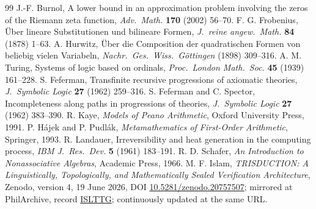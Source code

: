 \documentclass[twocolumn,10pt]{article}
\theoremstyle{plain}
\theoremstyle{definition}
\begin{document}
\begin{thebibliography}{99}
 J.-F. Burnol, A lower bound in an approximation problem involving the zeros of the Riemann zeta function, \emph{Adv.\ Math.} \textbf{170} (2002) 56--70.
 F. G. Frobenius, \"Uber lineare Substitutionen und bilineare Formen, \emph{J.\ reine angew.\ Math.} \textbf{84} (1878) 1--63.
 A. Hurwitz, \"Uber die Composition der quadratischen Formen von beliebig vielen Variabeln, \emph{Nachr.\ Ges.\ Wiss.\ G\"ottingen} (1898) 309--316.
 A. M. Turing, Systems of logic based on ordinals, \emph{Proc.\ London Math.\ Soc.} \textbf{45} (1939) 161--228.
 S. Feferman, Transfinite recursive progressions of axiomatic theories, \emph{J.\ Symbolic Logic} \textbf{27} (1962) 259--316.
 S. Feferman and C. Spector, Incompleteness along paths in progressions of theories, \emph{J.\ Symbolic Logic} \textbf{27} (1962) 383--390.
 R. Kaye, \emph{Models of Peano Arithmetic}, Oxford University Press, 1991.
 P. H\'ajek and P. Pudl\'ak, \emph{Metamathematics of First-Order Arithmetic}, Springer, 1993.
 R. Landauer, Irreversibility and heat generation in the computing process, \emph{IBM J.\ Res.\ Dev.} \textbf{5} (1961) 183--191.
 R. D. Schafer, \emph{An Introduction to Nonassociative Algebras}, Academic Press, 1966.
 M. F. Islam, \emph{TRISDUCTION: A Linguistically, Topologically, and Mathematically Sealed Verification Architecture}, Zenodo, version 4, 19 June 2026, DOI \href{https://doi.org/10.5281/zenodo.20757507}{10.5281/zenodo.20757507}; mirrored at PhilArchive, record \href{https://philpapers.org/rec/ISLTTG}{ISLTTG}; continuously updated at the same URL.
\end{thebibliography}
\end{document}
